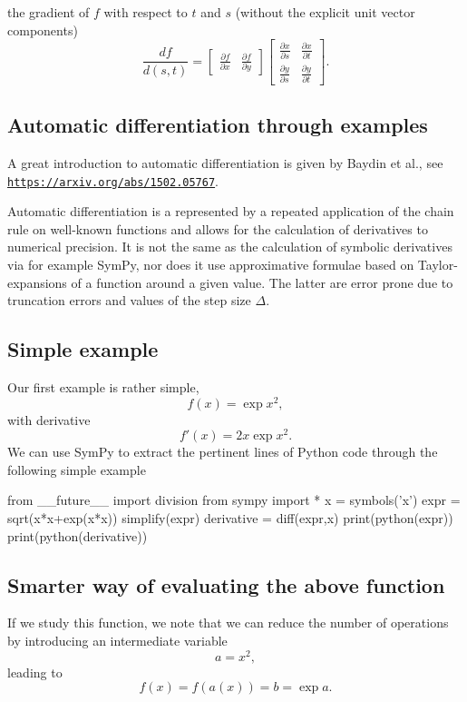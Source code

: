 \documentclass[%
oneside,                 %
final,                   %
10pt]{article}
\begin{document}
the gradient of $f$ with respect to $t$ and $s$ (without the explicit unit vector components)
\[
\frac{df}{d(s,t)} = \begin{bmatrix}\frac{\partial f}{\partial x} & \frac{\partial f}{\partial y} \end{bmatrix} \begin{bmatrix}\frac{\partial x}{\partial s}  &\frac{\partial x}{\partial t} \\ \frac{\partial y}{\partial s} & \frac{\partial y}{\partial t} \end{bmatrix}.
\]

\subsection{Automatic differentiation through examples}

A great introduction to automatic differentiation is given by Baydin et al., see \href{{https://arxiv.org/abs/1502.05767}}{\nolinkurl{https://arxiv.org/abs/1502.05767}}.

Automatic differentiation is a represented by a repeated application
of the chain rule on well-known functions and allows for the
calculation of derivatives to numerical precision. It is not the same
as the calculation of symbolic derivatives via for example SymPy, nor
does it use approximative formulae based on Taylor-expansions of a
function around a given value. The latter are error prone due to
truncation errors and values of the step size $\Delta$.

\subsection{Simple example}

Our first example is rather simple,
\[
f(x) =\exp{x^2},
\]
with derivative
\[
f'(x) =2x\exp{x^2}.
\]
We can use SymPy to extract the pertinent lines of Python code through the following simple example









\bpycod
from __future__ import division
from sympy import *
x = symbols('x')
expr = sqrt(x*x+exp(x*x))
simplify(expr)
derivative = diff(expr,x)
print(python(expr))
print(python(derivative))

\epycod


\subsection{Smarter way of evaluating the above function}
If we study this function, we note that we can reduce the number of operations by introducing an intermediate variable
\[
a = x^2,
\]
leading to 
\[
f(x) = f(a(x)) = b= \exp{a}.
\]
\end{document}

